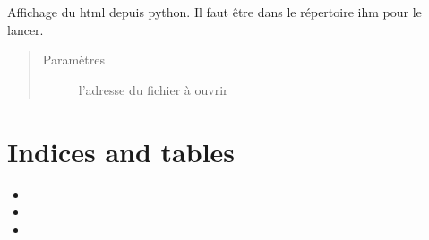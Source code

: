 \documentclass[letterpaper,10pt,french]{sphinxmanual}
\begin{document}
\begin{fulllineitems}
\label{\detokenize{index:src.ihm.web.open_html}}
\sphinxAtStartPar
Affichage du html depuis python. Il faut être dans le répertoire ihm pour le lancer.
\begin{quote}\begin{description}
\item[{Paramètres}] \leavevmode
\sphinxAtStartPar
{} \textendash{} l’adresse du fichier à ouvrir

\end{description}\end{quote}

\end{fulllineitems}



\chapter{Indices and tables}
\label{\detokenize{index:indices-and-tables}}\begin{itemize}
\item {} 
\sphinxAtStartPar
{}

\item {} 
\sphinxAtStartPar
{}

\item {} 
\sphinxAtStartPar
{}

\end{itemize}
\end{document}
